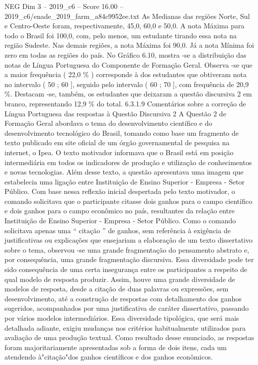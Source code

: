 \begin{textsample}{NEG Dim 3 – 2019\_c6 – Score 16.00 – 2019\_c6/enade\_2019\_farm\_a84c9952ee.txt}
As Medianas das regiões Norte, Sul e Centro-Oeste foram, respectivamente, 45,0, 60,0 e 50,0.
A nota Máxima para todo o Brasil foi 100,0, com, pelo menos, um estudante tirando essa nota na região Sudeste.
Nas demais regiões, a nota Máxima foi 90,0.
Já a nota Mínima foi zero em todas as regiões do país.
No Gráfico 6.10, mostra -se a distribuição das notas de Língua Portuguesa do Componente de Formação Geral.
Observa -se que a maior frequência ( 22,0 \% ) corresponde à dos estudantes que obtiveram nota no intervalo ( 50 ; 60 ], seguido pelo intervalo ( 60 ; 70 ], com frequência de 20,9 \%.
Destacam -se, também, os estudantes que deixaram a questão discursiva 2 em branco, representando 12,9 \% do total. 6.3.1.9 Comentários sobre a correção de Língua Portuguesa das respostas à Questão Discursiva 2 A Questão 2 de Formação Geral abordava o tema do desenvolvimento científico e do desenvolvimento tecnológico do Brasil, tomando como base um fragmento de texto publicado em site oficial de um órgão governamental de pesquisa na internet, o Ipea.
O texto motivador informava que o Brasil está em posição intermediária em todos os indicadores de produção e utilização de conhecimentos e novas tecnologias.
Além desse texto, a questão apresentava uma imagem que estabelecia uma ligação entre Instituição de Ensino Superior - Empresa - Setor Público.
Com base nessa reflexão inicial despertada pelo texto motivador, o comando solicitava que o participante citasse dois ganhos para o campo científico e dois ganhos para o campo econômico no país, resultantes da relação entre Instituição de Ensino Superior - Empresa - Setor Público.
Como o comando solicitava apenas uma “ citação ” de ganhos, sem referência à exigência de justificativas ou explicações que ensejariam a elaboração de um texto dissertativo sobre o tema, observou -se uma grande fragmentação do pensamento abstrato e, por consequência, uma grande fragmentação discursiva.
Essa diversidade pode ter sido consequência de uma certa insegurança entre os participantes a respeito de qual modelo de resposta produzir.
Assim, houve uma grande diversidade de modelos de resposta, desde a citação de duas palavras ou expressões, sem desenvolvimento, até a construção de respostas com detalhamento dos ganhos sugeridos, acompanhados por uma justificativa de caráter dissertativo, passando por vários modelos intermediários.
Essa diversidade tipológica, que será mais detalhada adiante, exigiu mudanças nos critérios habitualmente utilizados para avaliação de uma produção textual.
Como resultado desse enunciado, as respostas foram majoritariamente apresentadas sob a forma de dois itens, cada um atendendo à"citação"dos ganhos científicos e dos ganhos econômicos.

\end{textsample}

